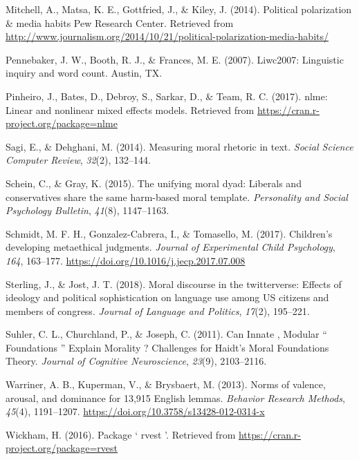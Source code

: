 \documentclass[
  english,
  man]{apa6}
\newlength{\cslhangindent}
\newlength{\cslentryspacingunit} %
\newenvironment{CSLReferences}[2] %
 {%
  \setlength{\parindent}{0pt}
  \ifodd #1
  \let\oldpar\par
  \def\par{\hangindent=\cslhangindent\oldpar}
  \fi
  \setlength{\parskip}{#2\cslentryspacingunit}
 }%
 {}
\begin{document}
\begin{CSLReferences}{1}{0}
\leavevmode{}%
Mitchell, A., Matsa, K. E., Gottfried, J., \& Kiley, J. (2014). {Political polarization {\&} media habits \textbar{} Pew Research Center}. Retrieved from \url{http://www.journalism.org/2014/10/21/political-polarization-media-habits/}

\leavevmode{}%
Pennebaker, J. W., Booth, R. J., \& Frances, M. E. (2007). {Liwc2007: Linguistic inquiry and word count}. Austin, TX.

\leavevmode{}%
Pinheiro, J., Bates, D., Debroy, S., Sarkar, D., \& Team, R. C. (2017). {nlme: Linear and nonlinear mixed effects models}. Retrieved from \url{https://cran.r-project.org/package=nlme}

\leavevmode{}%
Sagi, E., \& Dehghani, M. (2014). Measuring moral rhetoric in text. \emph{Social Science Computer Review}, \emph{32}(2), 132--144.

\leavevmode{}%
Schein, C., \& Gray, K. (2015). The unifying moral dyad: Liberals and conservatives share the same harm-based moral template. \emph{Personality and Social Psychology Bulletin}, \emph{41}(8), 1147--1163.

\leavevmode{}%
Schmidt, M. F. H., Gonzalez-Cabrera, I., \& Tomasello, M. (2017). {Children's developing metaethical judgments}. \emph{Journal of Experimental Child Psychology}, \emph{164}, 163--177. \url{https://doi.org/10.1016/j.jecp.2017.07.008}

\leavevmode{}%
Sterling, J., \& Jost, J. T. (2018). Moral discourse in the twitterverse: Effects of ideology and political sophistication on language use among US citizens and members of congress. \emph{Journal of Language and Politics}, \emph{17}(2), 195--221.

\leavevmode{}%
Suhler, C. L., Churchland, P., \& Joseph, C. (2011). {Can Innate , Modular {`` Foundations ''} Explain Morality ? Challenges for Haidt's Moral Foundations Theory}. \emph{Journal of Cognitive Neuroscience}, \emph{23}(9), 2103--2116.

\leavevmode{}%
Warriner, A. B., Kuperman, V., \& Brysbaert, M. (2013). {Norms of valence, arousal, and dominance for 13,915 English lemmas}. \emph{Behavior Research Methods}, \emph{45}(4), 1191--1207. \url{https://doi.org/10.3758/s13428-012-0314-x}

\leavevmode{}%
Wickham, H. (2016). {Package ` rvest '}. Retrieved from \url{https://cran.r-project.org/package=rvest}

\end{CSLReferences}

\endgroup
\end{document}
